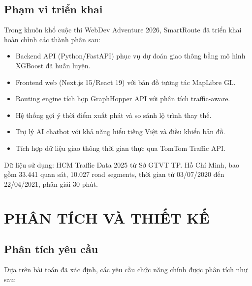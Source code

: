 \documentclass[12pt,a4paper]{article}
\begin{document}
\subsection{Phạm vi triển khai}
Trong khuôn khổ cuộc thi WebDev Adventure 2026, SmartRoute đã triển khai hoàn chỉnh các thành phần sau:
\begin{itemize}[leftmargin=1.2cm]
    \item Backend API (Python/FastAPI) phục vụ dự đoán giao thông bằng mô hình XGBoost đã huấn luyện.
    \item Frontend web (Next.js 15/React 19) với bản đồ tương tác MapLibre GL.
    \item Routing engine tích hợp GraphHopper API với phân tích traffic-aware.
    \item Hệ thống gợi ý thời điểm xuất phát và so sánh lộ trình thay thế.
    \item Trợ lý AI chatbot với khả năng hiểu tiếng Việt và điều khiển bản đồ.
    \item Tích hợp dữ liệu giao thông thời gian thực qua TomTom Traffic API.
\end{itemize}

Dữ liệu sử dụng: HCM Traffic Data 2025 từ Sở GTVT TP. Hồ Chí Minh, bao gồm 33.441 quan sát, 10.027 road segments, thời gian từ 03/07/2020 đến 22/04/2021, phân giải 30 phút.

\section{PHÂN TÍCH VÀ THIẾT KẾ}

\subsection{Phân tích yêu cầu}
Dựa trên bài toán đã xác định, các yêu cầu chức năng chính được phân tích như sau:
\end{document}
